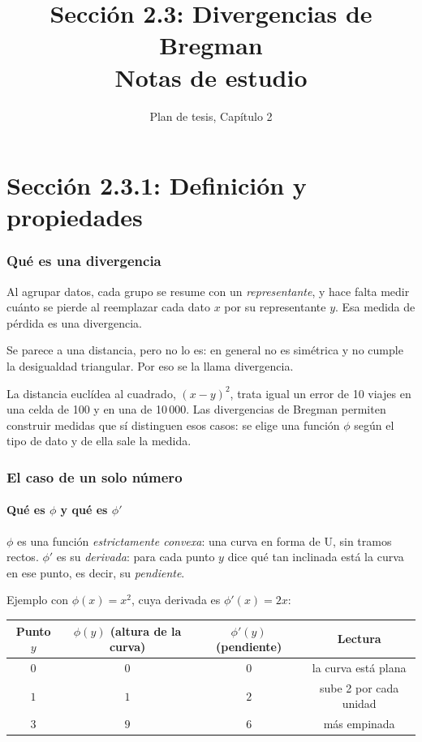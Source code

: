 \documentclass[11pt,a4paper]{article}
\title{Sección 2.3: Divergencias de Bregman\\Notas de estudio}
\author{Plan de tesis, Capítulo 2}
\date{}
\begin{document}
\maketitle
\tableofcontents

\part{Sección 2.3.1: Definición y propiedades}

\section{Qué es una divergencia}

Al agrupar datos, cada grupo se resume con un \emph{representante}, y hace falta
medir cuánto se pierde al reemplazar cada dato $x$ por su representante $y$. Esa
medida de pérdida es una divergencia.

Se parece a una distancia, pero no lo es: en general no es simétrica y no cumple
la desigualdad triangular. Por eso se la llama divergencia.

La distancia euclídea al cuadrado, $(x-y)^2$, trata igual un error de 10 viajes
en una celda de 100 y en una de 10\,000. Las divergencias de Bregman permiten
construir medidas que sí distinguen esos casos: se elige una función $\phi$ según
el tipo de dato y de ella sale la medida.

\section{El caso de un solo número}

\subsection{Qué es $\phi$ y qué es $\phi'$}

$\phi$ es una función \emph{estrictamente convexa}: una curva en forma de U, sin
tramos rectos. $\phi'$ es su \emph{derivada}: para cada punto $y$ dice qué tan
inclinada está la curva en ese punto, es decir, su \emph{pendiente}.

Ejemplo con $\phi(x)=x^2$, cuya derivada es $\phi'(x)=2x$:
\begin{center}
\begin{tabular}{cccc}
\toprule
Punto $y$ & $\phi(y)$ (altura de la curva) & $\phi'(y)$ (pendiente) & Lectura \\
\midrule
$0$ & $0$ & $0$ & la curva está plana \\
$1$ & $1$ & $2$ & sube 2 por cada unidad \\
$3$ & $9$ & $6$ & más empinada \\
\bottomrule
\end{tabular}
\end{center}
\end{document}
